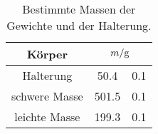 \begin{table}[H]
    \centering
    \caption[]{Bestimmte Massen der Gewichte und der Halterung.}
    \label{tab:massen}
    \begin{tabular}[pos]{S S[table-format = 3.1] @{${}\pm{}$} S[table-format = 1.1]}
        \toprule
        {Körper} &   \\
        \midrule
        {Halterung}     &  50.4 & 0.1 \\
        {schwere Masse} & 501.5 & 0.1 \\
        {leichte Masse} & 199.3 & 0.1 \\
        \bottomrule
    \end{tabular}
\end{table}